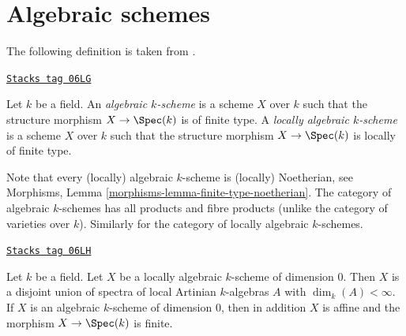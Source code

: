 \section{Algebraic schemes}
\label{varieties-section-algebraic-schemes}
The following definition is taken from
\cite[I Definition 6.4.1]{EGA}.

\begin{definition}
\label{varieties-definition-algebraic-scheme}
\href{https://stacks.math.columbia.edu/tag/06LG}{\texttt{Stacks tag 06LG}}

Let $k$ be a field. An {\it algebraic $k$-scheme} is a scheme $X$ over $k$
such that the structure morphism $X \to \Spec(k)$ is of
finite type. A {\it locally algebraic $k$-scheme} is a scheme $X$ over $k$
such that the structure morphism $X \to \Spec(k)$ is
locally of finite type.
\end{definition}

Note that every (locally) algebraic $k$-scheme is (locally) Noetherian, see
Morphisms, Lemma \ref{morphisms-lemma-finite-type-noetherian}.
The category of algebraic $k$-schemes has all products and fibre products
(unlike the category of varieties over $k$). Similarly for the category
of locally algebraic $k$-schemes.

\begin{lemma}
\label{varieties-lemma-algebraic-scheme-dim-0}
\href{https://stacks.math.columbia.edu/tag/06LH}{\texttt{Stacks tag 06LH}}

Let $k$ be a field. Let $X$ be a locally algebraic $k$-scheme of
dimension $0$. Then $X$ is a disjoint union of spectra of local Artinian
$k$-algebras $A$ with $\dim_k(A) < \infty$. If $X$ is an algebraic $k$-scheme
of dimension $0$, then in addition $X$ is affine and the morphism
$X \to \Spec(k)$ is finite.
\end{lemma}


